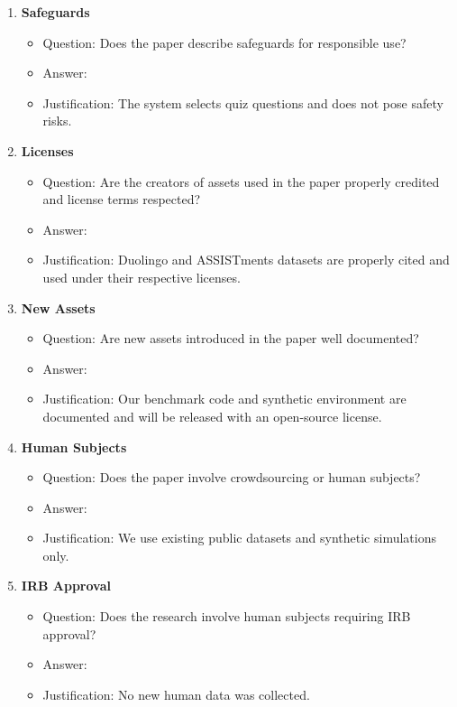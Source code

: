 \documentclass{article}
\begin{document}
\begin{enumerate}
\item {\bf Safeguards}
\begin{itemize}
  \item[] Question: Does the paper describe safeguards for responsible use?
  \item[] Answer: \answerNA{}
  \item[] Justification: The system selects quiz questions and does not pose safety risks.
\end{itemize}

\item {\bf Licenses}
\begin{itemize}
  \item[] Question: Are the creators of assets used in the paper properly credited and license terms respected?
  \item[] Answer: \answerYes{}
  \item[] Justification: Duolingo and ASSISTments datasets are properly cited and used under their respective licenses.
\end{itemize}

\item {\bf New Assets}
\begin{itemize}
  \item[] Question: Are new assets introduced in the paper well documented?
  \item[] Answer: \answerYes{}
  \item[] Justification: Our benchmark code and synthetic environment are documented and will be released with an open-source license.
\end{itemize}

\item {\bf Human Subjects}
\begin{itemize}
  \item[] Question: Does the paper involve crowdsourcing or human subjects?
  \item[] Answer: \answerNo{}
  \item[] Justification: We use existing public datasets and synthetic simulations only.
\end{itemize}

\item {\bf IRB Approval}
\begin{itemize}
  \item[] Question: Does the research involve human subjects requiring IRB approval?
  \item[] Answer: \answerNo{}
  \item[] Justification: No new human data was collected.
\end{itemize}

\end{enumerate}
\end{document}
